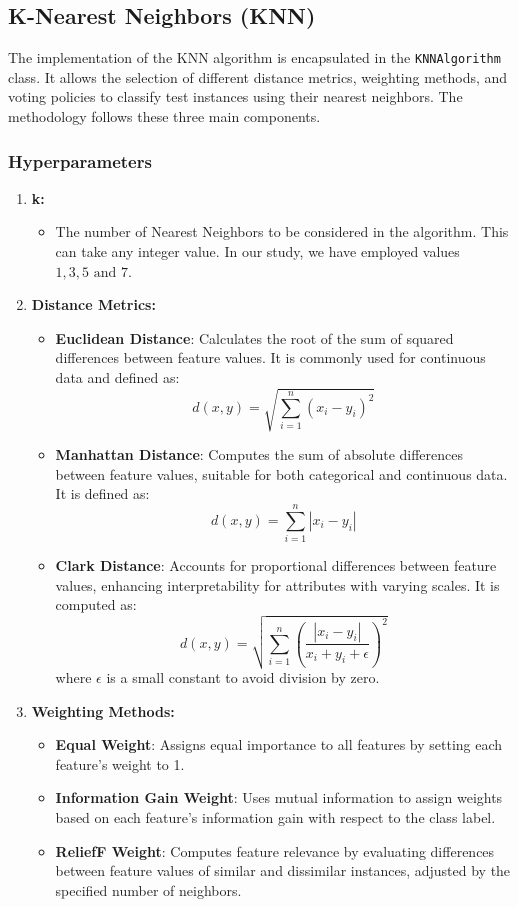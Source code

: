 \subsection{K-Nearest Neighbors (KNN)}

The implementation of the KNN algorithm is encapsulated in the \texttt{KNNAlgorithm} class. It allows the selection of different distance metrics, weighting methods, and voting policies to classify test instances using their nearest neighbors. The methodology follows these three main components.

\subsubsection{Hyperparameters}
\begin{enumerate}
    \item \textbf{k:}
    \begin{itemize}
        \item The number of Nearest Neighbors to be considered in the algorithm. This can take any integer value. In our study, we have employed values $ 1, 3, 5 \text{ and } 7 $.
    \end{itemize}

    \item \textbf{Distance Metrics:}
    \begin{itemize}
        \item \textbf{Euclidean Distance}: Calculates the root of the sum of squared differences between feature values. It is commonly used for continuous data and defined as:
        \[
        d(x, y) = \sqrt{\sum_{i=1}^{n} (x_i - y_i)^2}
        \]
        \item \textbf{Manhattan Distance}: Computes the sum of absolute differences between feature values, suitable for both categorical and continuous data. It is defined as:
        \[
        d(x, y) = \sum_{i=1}^{n} |x_i - y_i|
        \]
        \item \textbf{Clark Distance}: Accounts for proportional differences between feature values, enhancing interpretability for attributes with varying scales. It is computed as:
        \[
        d(x, y) = \sqrt{\sum_{i=1}^{n} \left(\frac{|x_i - y_i|}{x_i + y_i + \epsilon}\right)^2}
        \]
        where $\epsilon$ is a small constant to avoid division by zero.
    \end{itemize}

    \item \textbf{Weighting Methods:}
    \begin{itemize}
        \item \textbf{Equal Weight}: Assigns equal importance to all features by setting each feature's weight to 1.
        \item \textbf{Information Gain Weight}: Uses mutual information to assign weights based on each feature's information gain with respect to the class label.
        \item \textbf{ReliefF Weight}: Computes feature relevance by evaluating differences between feature values of similar and dissimilar instances, adjusted by the specified number of neighbors.
    \end{itemize}


\end{enumerate}
